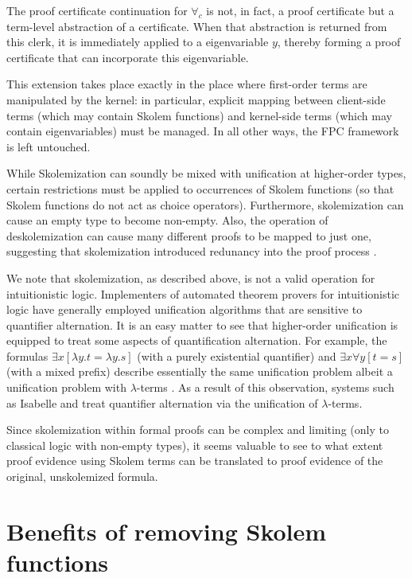 The proof certificate continuation for $\forall_c$ is not, in
  fact, a proof certificate but a term-level abstraction of a
  certificate.  When that abstraction is returned from this clerk, it
  is immediately applied to a eigenvariable $y$, thereby forming a
  proof certificate that can incorporate this eigenvariable.


This extension takes place exactly in the place where first-order
terms are manipulated by the kernel: in particular, explicit mapping
between client-side terms (which may contain Skolem functions) and
kernel-side terms (which may contain eigenvariables) must be managed.
%
In all other ways, the FPC framework is left untouched.
%




While Skolemization can soundly be mixed with unification at higher-order
types, certain restrictions must be applied to occurrences of Skolem
functions (so that Skolem functions do not act as choice operators).
%
Furthermore, skolemization can cause an empty type to become
non-empty.
%
Also, the operation of deskolemization can cause many different proofs
to be mapped to just one, suggesting that skolemization introduced
redunancy into the proof process \cite{miller92jsc}.

We note that skolemization, as described above, is not a valid
operation for intuitionistic logic.
%
Implementers of automated theorem provers for intuitionistic logic
have generally employed unification algorithms that are sensitive to
quantifier alternation.
%
It is an easy matter to see that higher-order unification 
is equipped to treat some aspects of quantification alternation.
%
For example, the formulas $\exists x[\lambda y. t = \lambda y. s]$
(with a purely existential quantifier) and $\exists x\forall y[ t =
  s]$ (with a mixed prefix) describe essentially the same unification
problem albeit a unification problem with $\lambda$-terms \cite{miller92jsc}.
%
As a result of this observation, systems such as Isabelle
\cite{paulson94book} and \lP \cite{miller12proghol} treat quantifier
alternation via the unification of $\lambda$-terms.

Since skolemization within formal proofs can be complex and limiting
(only to classical logic with non-empty types), it seems valuable to
see to what extent proof evidence using Skolem terms can be translated
to proof evidence of the original, unskolemized formula.
%


\section{Benefits of removing Skolem functions}

